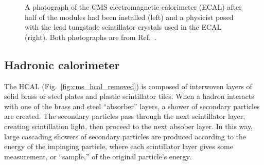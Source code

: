 \begin{figure}[htb]
    \centering
    \quad
    \caption{
        A photograph of the CMS electromagnetic calorimeter (ECAL) after half of the modules had been installed (left) and a physicist posed with the lead tungstade scintillator crystals used in the ECAL (right). 
        Both photographs are from Ref.~\cite{Brice:1431477}.
    }
    \label{fig:cms_ecal}
\end{figure}

\subsection{Hadronic calorimeter}
The HCAL (Fig.~\ref{fig:cms_hcal_removed}) is composed of interwoven layers of solid brass or steel plates and plastic scintillator tiles. 
When a hadron interacts with one of the brass and steel ``absorber'' layers, a shower of secondary particles are created. %
The secondary particles pass through the next scintillator layer, creating scintillation light, then proceed to the next absober layer. 
In this way, large cascading showers of secondary particles are produced according to the energy of the impinging particle, where each scintillator layer gives some measurement, or ``sample,'' of the original particle's energy. 

